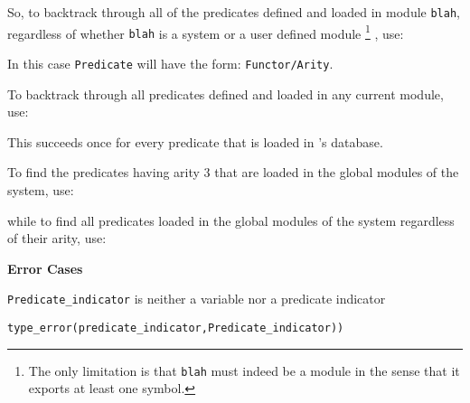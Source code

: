 \begin{description}
\begin{enumerate}
    \end{enumerate}

    So, to backtrack through all of the predicates defined and loaded in module 
    {\tt blah}, regardless of whether {\tt blah} is a system or a user 
    defined module
    \footnote{The only limitation is that {\tt blah} must indeed 
	      be a module in the sense that it exports at least one symbol.}
    , use:


    In this case {\tt Predicate} will have the form: {\tt Functor/Arity}.

    To backtrack through all predicates defined and loaded in any current 
    module, use:


    This succeeds once for every predicate that is loaded in \ourprolog's 
    database.

    To find the predicates having arity 3 that are loaded in the global 
    modules of the system, use: 


    while to find all predicates loaded in the global modules of the system
    regardless of their arity, use:



{\bf Error Cases}
\bi
\item 	{\tt Predicate\_indicator} is neither a variable nor a predicate indicator
\bi
\item 	{\tt type\_error(predicate\_indicator,Predicate\_indicator))}
\ei
\ei


\end{description}
